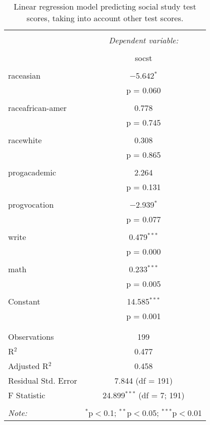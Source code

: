 
\begin{table}[!htbp] \centering 
  \caption{Linear regression model predicting social study test scores, taking into 
          account other test scores.} 
  \label{tab::lm_socst_peeking} 
\begin{tabular}{@{\extracolsep{5pt}}lc} 
\\[-1.8ex]\hline 
\hline \\[-1.8ex] 
 & \multicolumn{1}{c}{\textit{Dependent variable:}} \\ 
\cline{2-2} 
\\[-1.8ex] & socst \\ 
\hline \\[-1.8ex] 
 raceasian & $-$5.642$^{*}$ \\ 
  & p = 0.060 \\ 
  & \\ 
 raceafrican-amer & 0.778 \\ 
  & p = 0.745 \\ 
  & \\ 
 racewhite & 0.308 \\ 
  & p = 0.865 \\ 
  & \\ 
 progacademic & 2.264 \\ 
  & p = 0.131 \\ 
  & \\ 
 progvocation & $-$2.939$^{*}$ \\ 
  & p = 0.077 \\ 
  & \\ 
 write & 0.479$^{***}$ \\ 
  & p = 0.000 \\ 
  & \\ 
 math & 0.233$^{***}$ \\ 
  & p = 0.005 \\ 
  & \\ 
 Constant & 14.585$^{***}$ \\ 
  & p = 0.001 \\ 
  & \\ 
\hline \\[-1.8ex] 
Observations & 199 \\ 
R$^{2}$ & 0.477 \\ 
Adjusted R$^{2}$ & 0.458 \\ 
Residual Std. Error & 7.844 (df = 191) \\ 
F Statistic & 24.899$^{***}$ (df = 7; 191) \\ 
\hline 
\hline \\[-1.8ex] 
\textit{Note:}  & \multicolumn{1}{r}{$^{*}$p$<$0.1; $^{**}$p$<$0.05; $^{***}$p$<$0.01} \\ 
\end{tabular} 
\end{table} 
